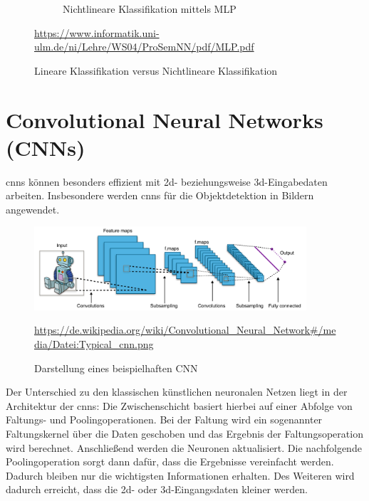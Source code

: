 \begin{figure}[H]
\begin{subfigure}[b]{0.3\textwidth}
		\caption{Nichtlineare Klassifikation mittels MLP}
		\label{non-linear-classification}
	\end{subfigure}
	\caption{Lineare Klassifikation versus Nichtlineare Klassifikation}
	\quelle\url{https://www.informatik.uni-ulm.de/ni/Lehre/WS04/ProSemNN/pdf/MLP.pdf}
\end{figure}

\section{Convolutional Neural Networks (CNNs)}

	\acf{cnns} können besonders effizient mit \acs{2d}- beziehungsweise \acs{3d}-Eingabedaten arbeiten. Insbesondere werden \acs{cnns} für die Objektdetektion in Bildern angewendet. \cite{datasolut4} \\
	
	\begin{figure}[H]
		\centering
		\includegraphics[width=0.9\textwidth]{kapitel3/images/cnn.png}
		\caption{Darstellung eines beispielhaften CNN}
		\vspace{0.2cm}
		\quelle\url{https://de.wikipedia.org/wiki/Convolutional_Neural_Network#/media/Datei:Typical_cnn.png}
	\end{figure}

	Der Unterschied zu den klassischen künstlichen neuronalen Netzen liegt in der Architektur der \acs{cnns}: Die Zwischenschicht basiert hierbei auf einer Abfolge von Faltungs- und Poolingoperationen. Bei der Faltung wird ein sogenannter Faltungskernel über die Daten geschoben und das Ergebnis der Faltungsoperation wird berechnet. Anschließend werden die Neuronen aktualisiert. Die nachfolgende Poolingoperation sorgt dann dafür, dass die Ergebnisse vereinfacht werden. Dadurch bleiben nur die wichtigsten Informationen erhalten.	Des Weiteren wird dadurch erreicht, dass die \acs{2d}- oder \acs{3d}-Eingangsdaten kleiner werden. \cite{datasolut4}



